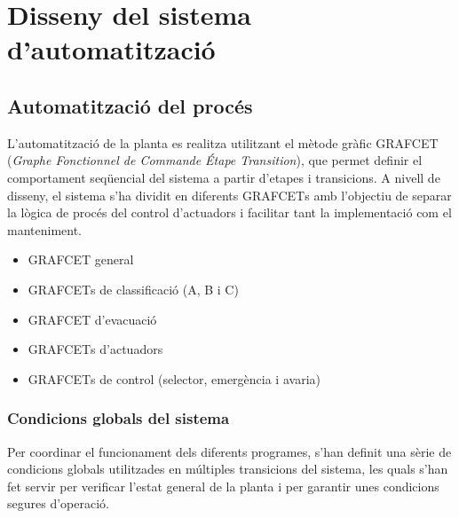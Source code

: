 \documentclass[a4paper,11pt,DIV=13,headings=normal,abstract=true,twoside=semi]{article}
\newcommand{\acro}[1]{\textsc{#1}}
\begin{document}
\newpage
\section{Disseny del sistema d'automatització}
\label{sec:disseny_grafcet}

\subsection{Automatització del procés}

L'automatització de la planta es realitza utilitzant el mètode gràfic \acro{GRAFCET} (\emph{Graphe Fonctionnel de Commande Étape Transition}), que permet definir el comportament seqüencial del sistema a partir d'etapes i transicions. A nivell de disseny, el sistema s'ha dividit en diferents \acro{GRAFCET}s amb l'objectiu de separar la lògica de procés del control d'actuadors i facilitar tant la implementació com el manteniment.

\begin{itemize}
\item \acro{GRAFCET} general
\item \acro{GRAFCET}s de classificació (A, B i C)
\item \acro{GRAFCET} d'evacuació
\item \acro{GRAFCET}s d'actuadors
\item \acro{GRAFCET}s de control (selector, emergència i avaria)
\end{itemize}

\subsubsection{Condicions globals del sistema}

Per coordinar el funcionament dels diferents programes, s'han definit una sèrie de condicions globals utilitzades en múltiples transicions del sistema, les quals s'han fet servir per verificar l'estat general de la planta i per garantir unes condicions segures d'operació.
\end{document}
